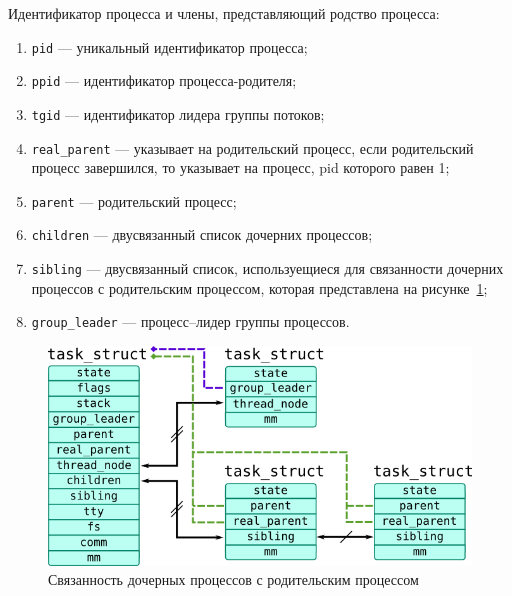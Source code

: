 Идентификатор процесса и члены, представляющий родство процесса:
\begin{enumerate}
	\item \texttt{pid} --- уникальный идентификатор процесса;
	\item \texttt{ppid} --- идентификатор процесса-родителя;
	\item \texttt{tgid} --- идентификатор лидера группы потоков;
	\item \texttt{real\_parent} --- указывает на родительский процесс, если родительский процесс завершился, то указывает на процесс, pid которого равен 1;
	\item \texttt{parent} --- родительский процесс;
	\item \texttt{children} --- двусвязанный список дочерних процессов; 
	\item \texttt{sibling} --- двусвязанный список, используещиеся для связанности дочерних процессов с родительским процессом, которая представлена на рисунке~\ref{img:structs:children-linkage}; 
	\item \texttt{group\_leader} --- процесс--лидер группы процессов. 
\end{enumerate}

\begin{figure}[h]
	\centering
	\includegraphics[height=0.3\textheight]{img/children-linkage.png}
	\caption{Связанность дочерных процессов с родительским процессом}
	\label{img:structs:children-linkage}
\end{figure}

\clearpage

